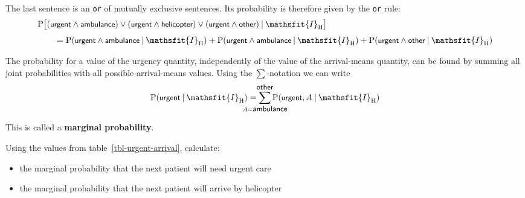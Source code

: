 \documentclass[
  a4paper,
  DIV=11,
  numbers=noendperiod,
  oneside]{scrreprt}
\providecommand{\tightlist}{%
  \setlength{\itemsep}{0pt}\setlength{\parskip}{0pt}}\usepackage{longtable,booktabs,array}
\begin{document}
The last sentence is an \texttt{or} of mutually exclusive sentences. Its
probability is therefore given by the \texttt{or} rule: \[
\begin{aligned}
&\mathrm{P}\bigl[
(\textsf{\small urgent}\land \textsf{\small ambulance}) \lor
(\textsf{\small urgent}\land \textsf{\small helicopter}) \lor
(\textsf{\small urgent}\land \textsf{\small other})
\nonscript\:\vert\nonscript\:\mathopen{} \mathsfit{I}_{\text{H}} \bigr]
\\[1ex]
&\qquad{}=
\mathrm{P}(\textsf{\small urgent}\land \textsf{\small ambulance}\nonscript\:\vert\nonscript\:\mathopen{} \mathsfit{I}_{\text{H}} ) +
\mathrm{P}(\textsf{\small urgent}\land \textsf{\small ambulance}\nonscript\:\vert\nonscript\:\mathopen{} \mathsfit{I}_{\text{H}} ) +
\mathrm{P}(\textsf{\small urgent}\land \textsf{\small other}\nonscript\:\vert\nonscript\:\mathopen{} \mathsfit{I}_{\text{H}} )
\end{aligned}
\]

The probability for a value of the urgency quantity, independently of
the value of the arrival-means quantity, can be found by summing all
joint probabilities with all possible arrival-means values. Using the
\(\sum\)-notation we can write \[
\mathrm{P}(\textsf{\small urgent} \nonscript\:\vert\nonscript\:\mathopen{} \mathsfit{I}_{\text{H}}) =
\sum_{\mathclap{A=\textsf{\small ambulance}}}^{\mathclap{\textsf{\small other}}}
\mathrm{P}(\textsf{\small urgent}, A \nonscript\:\vert\nonscript\:\mathopen{} \mathsfit{I}_{\text{H}})
\]

This is called a {\textbf{marginal probability}}.

\begin{tcolorbox}[enhanced jigsaw, colback=white, toptitle=1mm, title={\faIcon{user-edit} Exercise}, arc=.35mm, toprule=.15mm, rightrule=.15mm, coltitle=black, opacityback=0, colframe=quarto-callout-caution-color-frame, bottomtitle=1mm, colbacktitle=quarto-callout-caution-color!10!white, left=2mm, leftrule=.75mm, titlerule=0mm, breakable, opacitybacktitle=0.6, bottomrule=.15mm]

Using the values from table~\ref{tbl-urgent-arrival}, calculate:

\begin{itemize}
\tightlist
\item
  the marginal probability that the next patient will need urgent care
\item
  the marginal probability that the next patient will arrive by
  helicopter
\end{itemize}

\end{tcolorbox}
\end{document}
